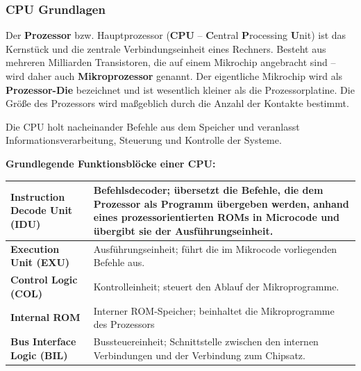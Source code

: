 \documentclass[10pt]{article}
\begin{document}
\begin{flushleft}
\subsubsection{CPU Grundlagen}

Der \textbf{Prozessor} bzw. Hauptprozessor (\textbf{CPU} – \textbf{C}entral \textbf{P}rocessing \textbf{U}nit) ist das Kernstück und die zentrale Verbindungseinheit eines Rechners.
Besteht aus mehreren Milliarden Transistoren, die auf einem Mikrochip angebracht sind – wird daher auch \textbf{Mikroprozessor} genannt.
Der eigentliche Mikrochip wird als \textbf{Prozessor-Die} bezeichnet und ist wesentlich kleiner als die Prozessorplatine. Die Größe des Prozessors wird maßgeblich durch die Anzahl der Kontakte bestimmt.

Die CPU holt nacheinander Befehle aus dem Speicher und veranlasst Informationsverarbeitung, Steuerung und Kontrolle der Systeme.

\textbf{Grundlegende Funktionsblöcke einer CPU:}

\begin{table}[H]
    \centering
    \begin{tabular}{|p{}|p{}|}
        \hline

        \textbf{Instruction Decode Unit (IDU)} & Befehlsdecoder; übersetzt die Befehle, die dem Prozessor als Programm übergeben werden, anhand eines prozessorientierten ROMs in Microcode und übergibt sie der Ausführungseinheit.

        \\\hline

        \textbf{Execution Unit (EXU)} & Ausführungseinheit; führt die im Mikrocode vorliegenden Befehle aus.

        \\\hline

        \textbf{Control Logic (COL)} & Kontrolleinheit; steuert den Ablauf der Mikroprogramme.

        \\\hline

        \textbf{Internal ROM} & Interner ROM-Speicher; beinhaltet die Mikroprogramme des Prozessors

        \\\hline

        \textbf{Bus Interface Logic (BIL)} & Bussteuereinheit; Schnittstelle zwischen den internen Verbindungen und der Verbindung zum Chipsatz.

        \\\hline


\end{tabular}
\end{table}
\end{flushleft}
\end{document}
